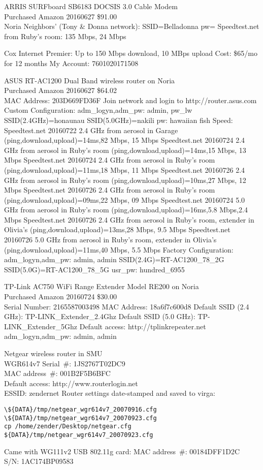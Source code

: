 \documentclass[12pt,twoside]{article}
\begin{document}
ARRIS SURFboard SB6183 DOCSIS 3.0 Cable Modem\\
Purchased Amazon 20160627 \$91.00\\

Noria Neighbors' (Tony \& Donna network):
SSID=Belladonna
pw=
Speedtest.net from Ruby's room: 135 Mbps, 24 Mbps

Cox Internet Premier: Up to 150 Mbps download, 10 MBps upload Cost: \$65/mo for 12 months
My Account: 7601020171508 

ASUS RT-AC1200 Dual Band wireless router on Noria\\
Purchased Amazon 20160627 \$64.02\\
MAC Address: 203D669FD36F
Join network and login to http://router.asus.com
Custom Configuration:
adm\_logyn,adm\_pw: admin, pw\_lw
SSID(2.4GHz)=honaunau
SSID(5.0GHz)=nakili
pw: hawaiian fish
Speed:
Speedtest.net 20160722 2.4 GHz from aerosol in Garage (ping,download,upload)=14ms,82 Mbps, 15 Mbps
Speedtest.net 20160724 2.4 GHz from aerosol in Ruby's room (ping,download,upload)=14ms,15 Mbps, 13 Mbps
Speedtest.net 20160724 2.4 GHz from aerosol in Ruby's room (ping,download,upload)=11ms,18 Mbps, 11 Mbps
Speedtest.net 20160726 2.4 GHz from aerosol in Ruby's room (ping,download,upload)=10ms,27 Mbps, 12 Mbps
Speedtest.net 20160726 2.4 GHz from aerosol in Ruby's room (ping,download,upload)=09ms,22 Mbps, 09 Mbps
Speedtest.net 20160724 5.0 GHz from aerosol in Ruby's room (ping,download,upload)=16ms,5.8 Mbps,2.4 Mbps
Speedtest.net 20160726 2.4 GHz from aerosol in Ruby's room, extender in Olivia's (ping,download,upload)=13ms,28 Mbps, 9.5 Mbps
Speedtest.net 20160726 5.0 GHz from aerosol in Ruby's room, extender in Olivia's (ping,download,upload)=11ms,40 Mbps, 5.5 Mbps
Factory Configuration:
adm\_logyn,adm\_pw: admin, admin
SSID(2.4G)=RT-AC1200\_78\_2G
SSID(5.0G)=RT-AC1200\_78\_5G
usr\_pw: hundred\_6955

TP-Link AC750 WiFi Range Extender Model RE200 on Noria\\
Purchased Amazon 20160724 \$30.00\\
Serial Number: 2165587003498
MAC Address: 18a6f7c600d8
Default SSID (2.4 GHz): TP-LINK\_Extender\_2.4Ghz
Default SSID (5.0 GHz): TP-LINK\_Extender\_5Ghz
Default access:
http://tplinkrepeater.net
adm\_logyn,adm\_pw: admin, admin

Netgear wireless router in SMU\\
WGR614v7
Serial~\#: 1JS2767T02DC9 \\
MAC address~\#: 001B2F5B6BFC \\
Default access: http://www.routerlogin.net \\
ESSID: zendernet
Router settings date-stamped and saved to virga: 
\begin{verbatim}
\${DATA}/tmp/netgear_wgr614v7_20070916.cfg
\${DATA}/tmp/netgear_wgr614v7_20070923.cfg
cp /home/zender/Desktop/netgear.cfg ${DATA}/tmp/netgear_wgr614v7_20070923.cfg
\end{verbatim}
Came with WG111v2 USB 802.11g card:
MAC address~\#: 00184DFF1D2C \\
S/N: 1AC174BP09583 \\
\end{document}
